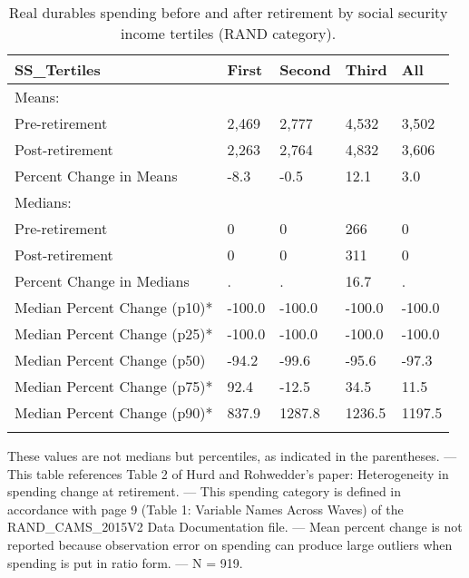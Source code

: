\begin{table}[tbp] \centering
{}

\caption{Real durables spending before and after retirement by social security income tertiles (RAND category).}
\begin{tabularx}{\textwidth}{lCCCC}

\toprule
{SS\_Tertiles}&{First}&{Second}&{Third}&{All} \tabularnewline
\midrule\addlinespace[1.5ex]
Means:&&&& \tabularnewline
\midrule Pre-retirement&2,469&2,777&4,532&3,502 \tabularnewline
Post-retirement&2,263&2,764&4,832&3,606 \tabularnewline
Percent Change in Means&-8.3&-0.5&12.1&3.0 \tabularnewline
\midrule Medians:&&&& \tabularnewline
\midrule Pre-retirement&0&0&266&0 \tabularnewline
Post-retirement&0&0&311&0 \tabularnewline
Percent Change in Medians&.&.&16.7&. \tabularnewline
Median Percent Change (p10)*&-100.0&-100.0&-100.0&-100.0 \tabularnewline
Median Percent Change (p25)*&-100.0&-100.0&-100.0&-100.0 \tabularnewline
Median Percent Change (p50)&-94.2&-99.6&-95.6&-97.3 \tabularnewline
Median Percent Change (p75)*&92.4&-12.5&34.5&11.5 \tabularnewline
Median Percent Change (p90)*&837.9&1287.8&1236.5&1197.5 \tabularnewline
\bottomrule \addlinespace[1.5ex]

\end{tabularx}
\begin{flushleft}
\footnotesize *These values are not medians but percentiles, as indicated in the parentheses. \linebreak --- \linebreak This table references Table 2 of Hurd and Rohwedder's paper: Heterogeneity in spending change at retirement. \linebreak --- \linebreak This spending category is defined in accordance with page 9 (Table 1: Variable Names Across Waves) of the RAND\_CAMS\_2015V2 Data Documentation file. \linebreak --- \linebreak Mean percent change is not reported because observation error on spending can produce large outliers when spending is put in ratio form. \linebreak --- \linebreak N = 919.
\end{flushleft}
\end{table}
